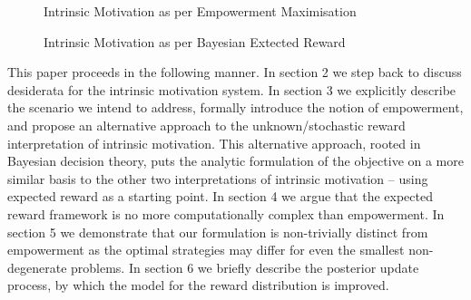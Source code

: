 \documentclass{article}
\begin{document}
\begin{figure}[h]
\centering
{}
\caption{Intrinsic Motivation as per Empowerment Maximisation} \label{fig:M3}
\end{figure}

\begin{figure}[h]
\centering
{}
\caption{Intrinsic Motivation as per Bayesian Extected Reward} \label{fig:M4}
\end{figure}

This paper proceeds in the following manner. In section 2 we step back to discuss desiderata for the intrinsic motivation system. In section 3 we explicitly describe the scenario we intend to address, formally introduce the notion of empowerment, and propose an alternative approach to the unknown/stochastic reward interpretation of intrinsic motivation. This alternative approach, rooted in Bayesian decision theory, puts the analytic formulation of the objective on a more similar basis to the other two interpretations of intrinsic motivation -- using expected reward as a starting point. In section 4 we argue that the expected reward framework is no more computationally complex than empowerment. In section 5 we demonstrate that our formulation is non-trivially distinct from empowerment as the optimal strategies may differ for even the smallest non-degenerate problems. In section 6 we briefly describe the posterior update process, by which the model for the reward distribution is improved.  
\end{document}
